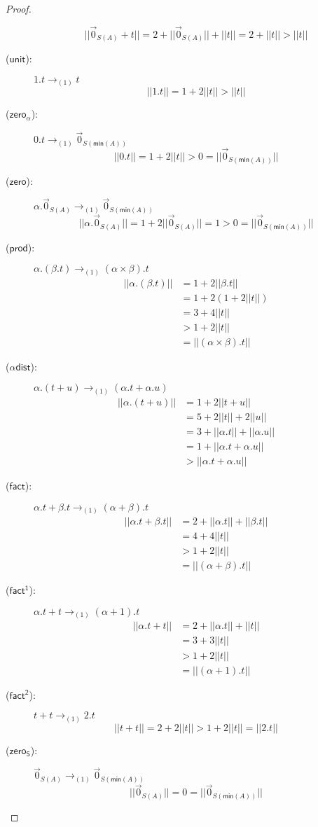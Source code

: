 \documentclass[preprint]{elsarticle}
\newcommand\size[1]{||#1||}
\newcommand\lra[1][1]{\longrightarrow_{\left(#1\right)}}
\newcommand\s[1]{\ensuremath{\mathsf{#1}}}
\newcommand\z[1][A]{\vec 0_{S(#1)}}
\newcommand\nullvec[1]{\z[#1]}
\newcommand\runit{(\s{unit})}
\newcommand\rzeros{(\s{zero_\alpha})}
\newcommand\rzero{(\s{zero})}
\newcommand\rzeroS{(\s{zero_S})}
\newcommand\rprod{(\s{prod})}
\newcommand\rdists{(\s{\alpha dist})}
\newcommand\rfact{(\s{fact})}
\newcommand\rfacto{(\s{fact^1})}
\newcommand\rfactt{(\s{fact^2})}
\begin{document}
\begin{proof}
\begin{description}
   \[
     \size{\nullvec{A} + t} = 2 + \size{\nullvec{A}} + \size{t} = 2 + \size{t} > \size{t}
   \]
 \item[\runit:] \( 1 . t \lra t \)
   \[
     \size{1 . t} = 1 + 2 \size{t} > \size{t}
   \]
 \item[\rzeros:] \( 0 . t \lra \z[\mathsf{min}(A)]\)
   \[
     \size{0. t} = 1 + 2 \size{t} > 0 = \size{\z[\mathsf{min}(A)]}
   \]
 \item[\rzero:] \( \alpha . \nullvec{A} \lra \z[\mathsf{min}(A)] \)
   \[
     \size{\alpha . \nullvec{A}} = 1 + 2 \size{\nullvec{A}} = 1 > 0 = \size{\z[\mathsf{min}(A)]}
   \]
 \item[\rprod:] \( \alpha . (\beta . t) \lra (\alpha \times \beta) . t \)
   \begin{align*}
     \size{\alpha . (\beta . t)}
     & = 1 + 2 \size{\beta . t} \\
     & = 1 + 2 (1 + 2 \size{t}) \\
     & = 3 + 4 \size{t} \\
     & > 1 + 2 \size{t} \\
     & = \size{(\alpha \times \beta) . t}
   \end{align*}
 \item[\rdists:] \( \alpha . (t + u) \lra (\alpha . t + \alpha . u) \)
   \begin{align*}
     \size{\alpha . (t + u)}
     & = 1 + 2 \size{t + u} \\
     & = 5 + 2 \size{t} + 2 \size{u} \\
     & = 3 + \size{\alpha . t} + \size{\alpha . u} \\
     & = 1 + \size{\alpha . t + \alpha . u} \\
     & > \size{\alpha . t + \alpha . u}
   \end{align*}
 \item[\rfact:] \( \alpha . t + \beta . t \lra (\alpha + \beta) . t \)
   \begin{align*}
     \size{\alpha . t + \beta . t}
     & = 2 + \size{\alpha . t} + \size{\beta . t} \\
     & = 4 + 4 \size{t} \\
     & > 1 + 2 \size{t} \\
     & = \size{(\alpha + \beta) . t}
   \end{align*}
 \item[\rfacto:] \( \alpha . t + t \lra (\alpha + 1) . t \)
   \begin{align*}
     \size{\alpha . t + t}
     & = 2 + \size{\alpha . t} + \size{t} \\
     & = 3 + 3 \size{t} \\
     & > 1 + 2 \size{t} \\
     & = \size{(\alpha + 1) . t}
   \end{align*}
 \item[\rfactt:] \( t + t \lra 2 . t \)
   \[
     \size{t + t} = 2 + 2 \size{t} > 1 + 2 \size{t} = \size{2 . t}
   \]
 \item[\rzeroS:] \(\z\lra\z[\mathsf{min}(A)]\)
   \[
     \size{\z}=0=\size{\z[\mathsf{min}(A)]}
   \]


\end{description}
\end{proof}
\end{document}
